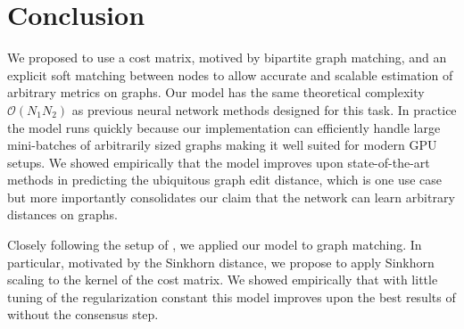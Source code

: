 \section{Conclusion}


We proposed to use a cost matrix, motived by bipartite graph matching, and an explicit soft matching between nodes to allow accurate and scalable estimation of arbitrary metrics on graphs. Our model has the same theoretical complexity $\mathcal{O}(N_1 N_2)$ as previous neural network methods designed for this task. In practice the model runs quickly because our implementation can efficiently handle large mini-batches of arbitrarily sized graphs making it well suited for modern GPU setups. We showed empirically that the model improves upon state-of-the-art methods in predicting the ubiquitous graph edit distance, which is one use case but more importantly consolidates our claim that the network can learn arbitrary distances on graphs.



Closely following the setup of \cite{fey2020_update}, we applied our  model to graph matching. In particular, motivated by the Sinkhorn distance, we propose to apply Sinkhorn scaling to the kernel of the cost matrix. We showed empirically that with little tuning of the regularization constant this model improves upon the best results of \cite{fey2020_update} without the consensus step.

